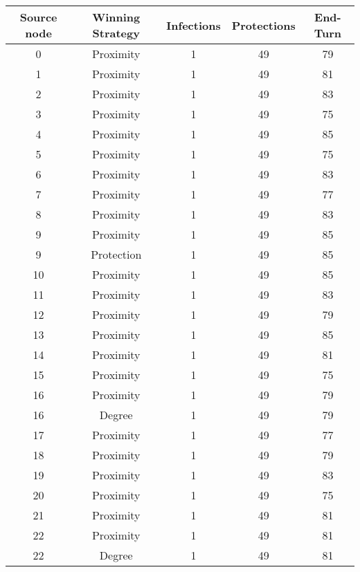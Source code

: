 \documentclass[results.tex]{subfiles}
\begin{document}
\begin{center}
  \begin{tabular}{| c || c | c | c | c |}
    \hline
    {\bfseries Source node} & {\bfseries Winning Strategy} & {\bfseries Infections} & {\bfseries Protections} & {\bfseries End-Turn} \\  %
    \hline\hline
    0 & Proximity & 1 & 49 & 79 \\ 
    \hline
    1 & Proximity & 1 & 49 & 81 \\ 
    \hline
    2 & Proximity & 1 & 49 & 83 \\ 
    \hline
    3 & Proximity & 1 & 49 & 75 \\ 
    \hline
    4 & Proximity & 1 & 49 & 85 \\ 
    \hline
    5 & Proximity & 1 & 49 & 75 \\ 
    \hline
    6 & Proximity & 1 & 49 & 83 \\ 
    \hline
    7 & Proximity & 1 & 49 & 77 \\ 
    \hline
    8 & Proximity & 1 & 49 & 83 \\ 
    \hline
    9 & Proximity & 1 & 49 & 85 \\ 
    \hline
    9 & Protection & 1 & 49 & 85 \\ 
    \hline
    10 & Proximity & 1 & 49 & 85 \\ 
    \hline
    11 & Proximity & 1 & 49 & 83 \\ 
    \hline
    12 & Proximity & 1 & 49 & 79 \\ 
    \hline
    13 & Proximity & 1 & 49 & 85 \\ 
    \hline
    14 & Proximity & 1 & 49 & 81 \\ 
    \hline
    15 & Proximity & 1 & 49 & 75 \\ 
    \hline
    16 & Proximity & 1 & 49 & 79 \\ 
    \hline
    16 & Degree & 1 & 49 & 79 \\ 
    \hline
    17 & Proximity & 1 & 49 & 77 \\ 
    \hline
    18 & Proximity & 1 & 49 & 79 \\ 
    \hline
    19 & Proximity & 1 & 49 & 83 \\ 
    \hline
    20 & Proximity & 1 & 49 & 75 \\ 
    \hline
    21 & Proximity & 1 & 49 & 81 \\ 
    \hline
    22 & Proximity & 1 & 49 & 81 \\ 
    \hline
    22 & Degree & 1 & 49 & 81 \\ 

\end{tabular}
\end{center}
\end{document}
